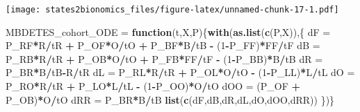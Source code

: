 \documentclass[]{article}
\newenvironment{Shaded}{\begin{snugshade}}{\end{snugshade}}
\newcommand{\ControlFlowTok}[1]{\textcolor[rgb]{0.13,0.29,0.53}{\textbf{#1}}}
\newcommand{\DecValTok}[1]{\textcolor[rgb]{0.00,0.00,0.81}{#1}}
\newcommand{\KeywordTok}[1]{\textcolor[rgb]{0.13,0.29,0.53}{\textbf{#1}}}
\newcommand{\NormalTok}[1]{#1}
\newcommand{\OperatorTok}[1]{\textcolor[rgb]{0.81,0.36,0.00}{\textbf{#1}}}
\newcommand{\StringTok}[1]{\textcolor[rgb]{0.31,0.60,0.02}{#1}}
\begin{document}
\texttt{[image: states2bionomics\_files/figure-latex/unnamed-chunk-17-1.pdf]}

\begin{Shaded}
\begin{Highlighting}[]
\NormalTok{MBDETES_cohort_ODE =}\StringTok{ }\ControlFlowTok{function}\NormalTok{(t,X,P)\{}\KeywordTok{with}\NormalTok{(}\KeywordTok{as.list}\NormalTok{(}\KeywordTok{c}\NormalTok{(P,X)),\{}
\NormalTok{  dF =}\StringTok{ }\NormalTok{P_RF}\OperatorTok{*}\NormalTok{R}\OperatorTok{/}\NormalTok{tR }\OperatorTok{+}\StringTok{ }\NormalTok{P_OF}\OperatorTok{*}\NormalTok{O}\OperatorTok{/}\NormalTok{tO }\OperatorTok{+}\StringTok{ }\NormalTok{P_BF}\OperatorTok{*}\NormalTok{B}\OperatorTok{/}\NormalTok{tB }\OperatorTok{-}\StringTok{ }\NormalTok{(}\DecValTok{1}\OperatorTok{-}\NormalTok{P_FF)}\OperatorTok{*}\NormalTok{FF}\OperatorTok{/}\NormalTok{tF}
\NormalTok{  dB =}\StringTok{ }\NormalTok{P_RB}\OperatorTok{*}\NormalTok{R}\OperatorTok{/}\NormalTok{tR }\OperatorTok{+}\StringTok{ }\NormalTok{P_OB}\OperatorTok{*}\NormalTok{O}\OperatorTok{/}\NormalTok{tO }\OperatorTok{+}\StringTok{ }\NormalTok{P_FB}\OperatorTok{*}\NormalTok{FF}\OperatorTok{/}\NormalTok{tF }\OperatorTok{-}\StringTok{ }\NormalTok{(}\DecValTok{1}\OperatorTok{-}\NormalTok{P_BB)}\OperatorTok{*}\NormalTok{B}\OperatorTok{/}\NormalTok{tB}
\NormalTok{  dR =}\StringTok{ }\NormalTok{P_BR}\OperatorTok{*}\NormalTok{B}\OperatorTok{/}\NormalTok{tB}\OperatorTok{-}\NormalTok{R}\OperatorTok{/}\NormalTok{tR}
\NormalTok{  dL =}\StringTok{ }\NormalTok{P_RL}\OperatorTok{*}\NormalTok{R}\OperatorTok{/}\NormalTok{tR }\OperatorTok{+}\StringTok{ }\NormalTok{P_OL}\OperatorTok{*}\NormalTok{O}\OperatorTok{/}\NormalTok{tO }\OperatorTok{-}\StringTok{ }\NormalTok{(}\DecValTok{1}\OperatorTok{-}\NormalTok{P_LL)}\OperatorTok{*}\NormalTok{L}\OperatorTok{/}\NormalTok{tL}
\NormalTok{  dO =}\StringTok{ }\NormalTok{P_RO}\OperatorTok{*}\NormalTok{R}\OperatorTok{/}\NormalTok{tR }\OperatorTok{+}\StringTok{ }\NormalTok{P_LO}\OperatorTok{*}\NormalTok{L}\OperatorTok{/}\NormalTok{tL }\OperatorTok{-}\StringTok{ }\NormalTok{(}\DecValTok{1}\OperatorTok{-}\NormalTok{P_OO)}\OperatorTok{*}\NormalTok{O}\OperatorTok{/}\NormalTok{tO}
\NormalTok{  dOO =}\StringTok{ }\NormalTok{(P_OF }\OperatorTok{+}\StringTok{ }\NormalTok{P_OB)}\OperatorTok{*}\NormalTok{O}\OperatorTok{/}\NormalTok{tO}
\NormalTok{  dRR =}\StringTok{ }\NormalTok{P_BR}\OperatorTok{*}\NormalTok{B}\OperatorTok{/}\NormalTok{tB }
  \KeywordTok{list}\NormalTok{(}\KeywordTok{c}\NormalTok{(dF,dB,dR,dL,dO,dOO,dRR))}
\NormalTok{\})\}}


\end{Highlighting}
\end{Shaded}
\end{document}
